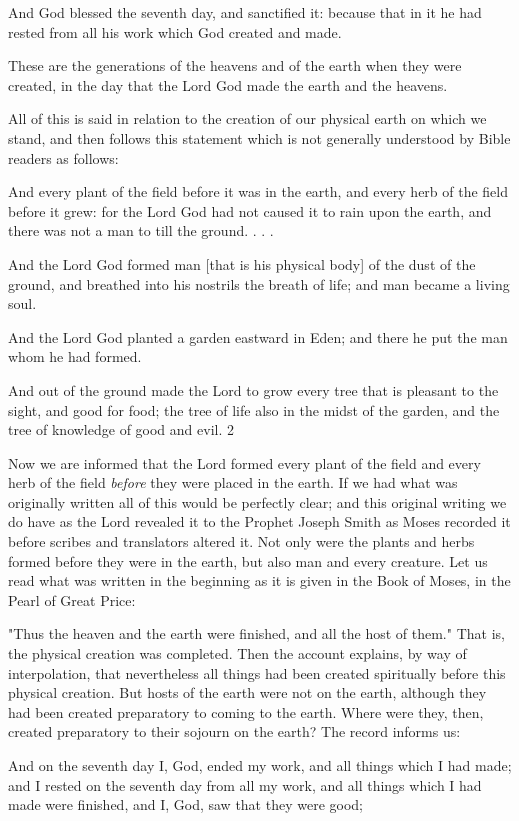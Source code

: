 And God blessed the seventh day, and sanctified it: because that in it he had rested from all
his work which God created and made.

These are the generations of the heavens and of the earth when they were created, in the day
that the Lord God made the earth and the heavens.

All of this is said in relation to the creation of our physical earth on which we stand, and then
follows this statement which is not generally understood by Bible readers as follows:

And every plant of the field before it was in the earth, and every herb of the field before it
grew: for the Lord God had not caused it to rain upon the earth, and there was not a man to
till the ground. . . .

And the Lord God formed man [that is his physical body] of the dust of the ground, and
breathed into his nostrils the breath of life; and man became a living soul.

And the Lord God planted a garden eastward in Eden; and there he put the man whom he had
formed.

And out of the ground made the Lord to grow every tree that is pleasant to the sight, and
good for food; the tree of life also in the midst of the garden, and the tree of knowledge of
good and evil. 2

Now we are informed that the Lord formed every plant of the field and every herb of the field
\textit{before} they were placed in the earth. If we had what was originally written all of this would
be perfectly clear; and this original writing we do have as the Lord revealed it to the Prophet
Joseph Smith as Moses recorded it before scribes and translators altered it. Not only were the
plants and herbs formed before they were in the earth, but also man and every creature. Let
us read what was written in the beginning as it is given in the Book of Moses, in the Pearl of
Great Price:

"Thus the heaven and the earth were finished, and all the host of them." That is, the physical
creation was completed. Then the account explains, by way of interpolation, that nevertheless
all things had been created spiritually before this physical creation. But hosts of the earth
were not on the earth, although they had been created preparatory to coming to the earth.
Where were they, then, created preparatory to their sojourn on the earth? The record informs
us:

And on the seventh day I, God, ended my work, and all things which I had made; and I rested
on the seventh day from all my work, and all things which I had made were finished, and I,
God, saw that they were good;

